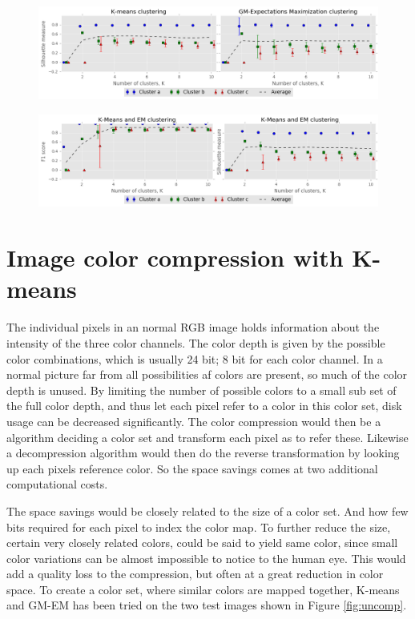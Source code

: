 \documentclass[a4paper,10pt,article,oneside,english]{memoir}
\let\oldcaption\caption
\renewcommand{\caption}[1]{\oldcaption{\emph{#1}}}
\begin{document}
\begin{figure}
	\centering
	\includegraphics[width=\textwidth]{silhouette_vs_k.png}
	\caption{}
	\label{fig:silhouette}
\end{figure}

\begin{figure}
	\centering
	\includegraphics[width=\textwidth]{combined_clustering.png}
	\caption{}
	\label{fig:combined_clustering}
\end{figure}

\section*{Image color compression with K-means}
The individual pixels in an normal RGB image holds information about the intensity of the three color channels. The color depth is given by the possible color combinations, which is usually 24 bit; 8 bit for each color channel. In a normal picture far from all possibilities af colors are present, so much of the color depth is unused. By limiting the number of possible colors to a small sub set of the full color depth, and thus let each pixel refer to a color in this color set, disk usage can be decreased significantly. The color compression would then be a algorithm deciding a color set and transform each pixel as to refer these. Likewise a decompression algorithm would then do the reverse transformation by looking up each pixels reference color. So the space savings comes at two additional computational costs.

The space savings would be closely related to the size of a color set. And how few bits required for each pixel to index the color map. To further reduce the size, certain very closely related colors, could be said to yield same color, since small color variations can be almost impossible to notice to the human eye. This would add a quality loss to the compression, but often at a great reduction in color space. To create a color set, where similar colors are mapped together, K-means and GM-EM has been tried on the two test images shown in Figure \ref{fig:uncomp}. 
\end{document}
